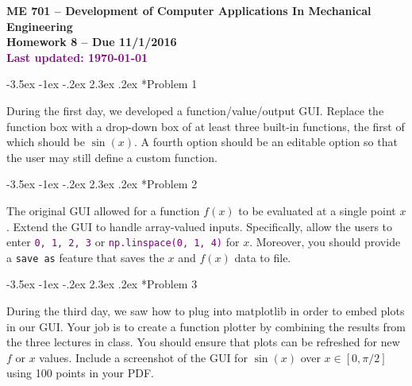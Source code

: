 \documentclass[11pt]{article}
\makeatletter
\renewcommand\section{\@startsection{section}{1}{\z@}%
                                  {-3.5ex \@plus -1ex \@minus -.2ex}%
                                  {2.3ex \@plus.2ex}%
                                  {\normalfont\bfseries}}
\makeatother
\begin{document}
{\large
  \begin{center}
    {\bf ME 701 -- Development of Computer Applications In Mechanical Engineering \\ 
         Homework 8  -- Due 11/1/2016 \\
         \vspace{12pt}
         \textcolor{purple}{Last updated: \today}
    }
  \end{center}

\setlength{\unitlength}{1in}

}



\vspace{12pt}







\section*{Problem 1}

During the first day, we developed a function/value/output 
GUI.  Replace the function box with a drop-down box of at least
three built-in functions, the first of which should be $\sin(x)$.
A fourth option should be an editable option so that the user may
still define a custom function.


\section*{Problem 2}

The original GUI allowed for a function $f(x)$ to be evaluated at a single
point $x$.  Extend the GUI to handle array-valued inputs.  Specifically, 
allow the users to enter 
\textcolor{purple}{{\tt 0, 1, 2, 3}} or 
\textcolor{purple}{{\tt np.linspace(0, 1, 4)}}
for $x$.  Moreover, you should provide a {\tt save as} feature that
saves the $x$ and $f(x)$ data to file.  



\section*{Problem 3}

During the third day, we saw how to plug into matplotlib in order to 
embed plots in our GUI.  Your job is to create a function plotter by
combining the results from the three lectures in class.  You should 
ensure that plots can be refreshed for new $f$ or $x$ values.  
Include a screenshot of the GUI for 
$\sin(x)$ over $x \in [0, \pi/2]$ using 100 points in your PDF.
\end{document}
